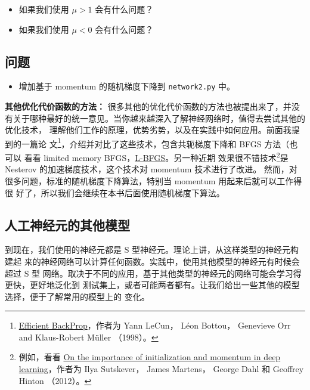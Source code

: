 \begin{itemize}
\item 如果我们使用 $\mu > 1$ 会有什么问题？
\item 如果我们使用 $\mu < 0$ 会有什么问题？
\end{itemize}

\subsection*{问题}

\begin{itemize}
\item 增加基于 momentum 的随机梯度下降到 \lstinline!network2.py! 中。
\end{itemize}

\textbf{其他优化代价函数的方法：} 很多其他的优化代价函数的方法也被提出来了，并没
有关于哪种最好的统一意见。当你越来越深入了解神经网络时，值得去尝试其他的优化技术，
理解他们工作的原理，优势劣势，以及在实践中如何应用。前面我提到的一篇论
文\footnote{\href{http://yann.lecun.com/exdb/publis/pdf/lecun-98b.pdf}{Efficient
    BackProp}，作者为 Yann LeCun， Léon Bottou， Genevieve Orr and Klaus-Robert
  Müller （1998）。}，介绍并对比了这些技术，包含共轭梯度下降和 BFGS 方法（也可以
看看 limited memory
BFGS，\href{http://en.wikipedia.org/wiki/Limited-memory_BFGS}{L-BFGS}。另一种近期
效果很不错技术\footnote{例如，看看 \href{http://www.cs.toronto.edu/~hinton/absps/momentum.pdf}{On the
    importance of initialization and momentum in deep learning}，作者为 Ilya
  Sutskever， James Martens， George Dahl 和 Geoffrey
  Hinton （2012）。}是Nesterov 的加速梯度技术，这个技术对 momentum 技术进行了改进。
然而，对很多问题，标准的随机梯度下降算法，特别当 momentum 用起来后就可以工作得很
好了，所以我们会继续在本书后面使用随机梯度下算法。

\subsection{人工神经元的其他模型}
\label{subsec:other_models_of_artificial_neuron}

到现在，我们使用的神经元都是 S 型神经元。理论上讲，从这样类型的神经元构建起
来的神经网络可以计算任何函数。实践中，使用其他模型的神经元有时候会超过 S 型
网络。取决于不同的应用，基于其他类型的神经元的网络可能会学习得更快，更好地泛化到
测试集上，或者可能两者都有。让我们给出一些其他的模型选择，便于了解常用的模型上的
变化。

